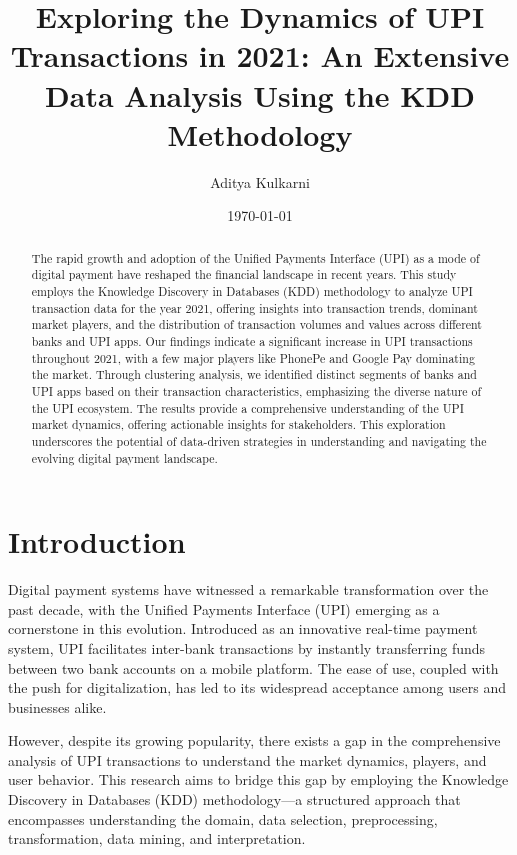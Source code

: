 \documentclass[12pt]{article}
\title{Exploring the Dynamics of UPI Transactions in 2021: An Extensive Data Analysis Using the KDD Methodology}
\author{Aditya Kulkarni}
\date{\today}
\begin{document}
\maketitle

\begin{abstract}
The rapid growth and adoption of the Unified Payments Interface (UPI) as a mode of digital payment have reshaped the financial landscape in recent years. This study employs the Knowledge Discovery in Databases (KDD) methodology to analyze UPI transaction data for the year 2021, offering insights into transaction trends, dominant market players, and the distribution of transaction volumes and values across different banks and UPI apps. Our findings indicate a significant increase in UPI transactions throughout 2021, with a few major players like PhonePe and Google Pay dominating the market. Through clustering analysis, we identified distinct segments of banks and UPI apps based on their transaction characteristics, emphasizing the diverse nature of the UPI ecosystem. The results provide a comprehensive understanding of the UPI market dynamics, offering actionable insights for stakeholders. This exploration underscores the potential of data-driven strategies in understanding and navigating the evolving digital payment landscape.
\end{abstract}

\section{Introduction}

Digital payment systems have witnessed a remarkable transformation over the past decade, with the Unified Payments Interface (UPI) emerging as a cornerstone in this evolution. Introduced as an innovative real-time payment system, UPI facilitates inter-bank transactions by instantly transferring funds between two bank accounts on a mobile platform. The ease of use, coupled with the push for digitalization, has led to its widespread acceptance among users and businesses alike.

However, despite its growing popularity, there exists a gap in the comprehensive analysis of UPI transactions to understand the market dynamics, players, and user behavior. This research aims to bridge this gap by employing the Knowledge Discovery in Databases (KDD) methodology—a structured approach that encompasses understanding the domain, data selection, preprocessing, transformation, data mining, and interpretation.
\end{document}
